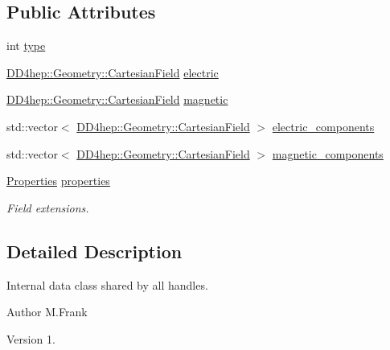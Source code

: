 \subsection*{Public Attributes}
\begin{DoxyCompactItemize}
\item 
int \hyperlink{class_d_d4hep_1_1_geometry_1_1_overlayed_field_1_1_object_a9cf611593f516274f139d0524d8480de}{type}
\item 
\hyperlink{class_d_d4hep_1_1_geometry_1_1_cartesian_field}{D\+D4hep\+::\+Geometry\+::\+Cartesian\+Field} \hyperlink{class_d_d4hep_1_1_geometry_1_1_overlayed_field_1_1_object_a3bdf6ca218ef224725fa0a28e050c1a1}{electric}
\item 
\hyperlink{class_d_d4hep_1_1_geometry_1_1_cartesian_field}{D\+D4hep\+::\+Geometry\+::\+Cartesian\+Field} \hyperlink{class_d_d4hep_1_1_geometry_1_1_overlayed_field_1_1_object_ad7154abfd06456e5530e93b29c2bab40}{magnetic}
\item 
std\+::vector$<$ \hyperlink{class_d_d4hep_1_1_geometry_1_1_cartesian_field}{D\+D4hep\+::\+Geometry\+::\+Cartesian\+Field} $>$ \hyperlink{class_d_d4hep_1_1_geometry_1_1_overlayed_field_1_1_object_aae39088c562716b2948e205cebb2c8b4}{electric\+\_\+components}
\item 
std\+::vector$<$ \hyperlink{class_d_d4hep_1_1_geometry_1_1_cartesian_field}{D\+D4hep\+::\+Geometry\+::\+Cartesian\+Field} $>$ \hyperlink{class_d_d4hep_1_1_geometry_1_1_overlayed_field_1_1_object_ab56126a85338942dfac10260834e88a4}{magnetic\+\_\+components}
\item 
\hyperlink{class_d_d4hep_1_1_geometry_1_1_overlayed_field_acdf81fbf8e0c336cb724ee2846a2c5b0}{Properties} \hyperlink{class_d_d4hep_1_1_geometry_1_1_overlayed_field_1_1_object_a184fdde08ca58abba25c3fbe812e21bc}{properties}
\begin{DoxyCompactList}\small\item\em Field extensions. \end{DoxyCompactList}\end{DoxyCompactItemize}


\subsection{Detailed Description}
Internal data class shared by all handles. 

\begin{DoxyAuthor}{Author}
M.\+Frank 
\end{DoxyAuthor}
\begin{DoxyVersion}{Version}
1. 
\end{DoxyVersion}


